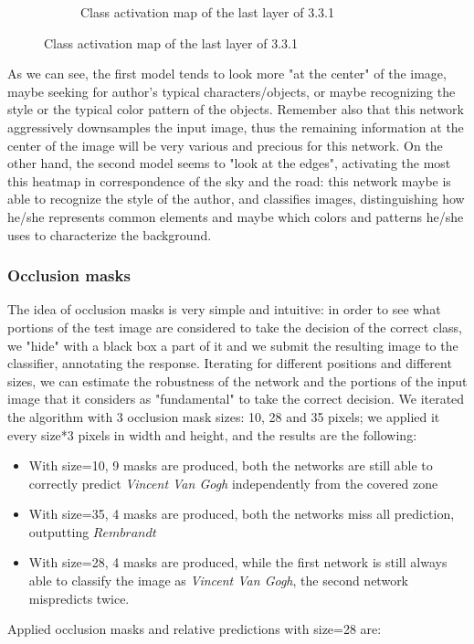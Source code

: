 \begin{figure}[H]
\begin{subfigure}{0.5\textwidth}
		\caption{Class activation map of the last layer of 3.3.1}
		\label{fig:il_heatmap}
	\end{subfigure}
\end{figure}

\noindent As we can see, the first model tends to look more "at the center" of the image, maybe seeking for author's typical characters/objects, or maybe recognizing the style or the typical color pattern of the objects. Remember also that this network aggressively downsamples the input image, thus the remaining information at the center of the image will be very various and precious for this network. On the other hand, the second model seems to "look at the edges", activating the most this heatmap in correspondence of the sky and the road: this network maybe is able to recognize the style of the author, and classifies images, distinguishing how he/she represents common elements and maybe which colors and patterns he/she uses to characterize the background.

\subsubsection{Occlusion masks}
The idea of occlusion masks is very simple and intuitive: in order to see what portions of the test image are considered to take the decision of the correct class, we "hide" with a black box a part of it and we submit the resulting image to the classifier, annotating the response. Iterating for different positions and different sizes, we can estimate the robustness of the network and the portions of the input image that it considers as "fundamental" to take the correct decision.
We iterated the algorithm with 3 occlusion mask sizes: 10, 28 and 35 pixels; we applied it every size*3 pixels in width and height, and the results are the following:
\begin{itemize}
\item With size=10, 9 masks are produced, both the networks are still able to correctly predict \textit{Vincent Van Gogh} independently from the covered zone
\item With size=35, 4 masks are produced, both the networks miss all prediction, outputting $Rembrandt$
\item With size=28, 4 masks are produced, while the first network is still always able to classify the image as \textit{Vincent Van Gogh}, the second network mispredicts twice.
\end{itemize}

\noindent Applied occlusion masks and relative predictions with size=28 are:

